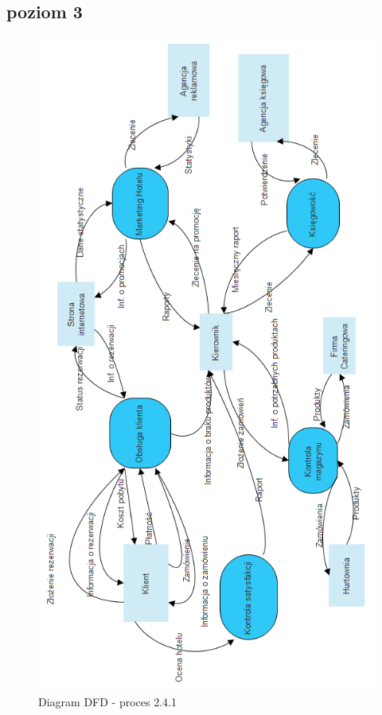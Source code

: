 \documentclass[a4paper, 11pt]{article}
\begin{document}
	\subsection{poziom 3}
	\indent
	\begin{figure}[H]%
			\center
			\includegraphics[scale=0.7]{Img/DFDpoziom0.png}
			\caption{Diagram DFD - proces 2.4.1}
	\end{figure}		
	
\end{document}
